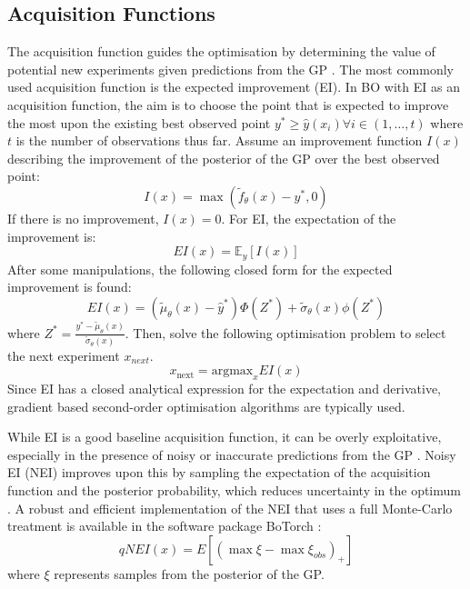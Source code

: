 \subsection{Acquisition Functions}

The acquisition function guides the optimisation by determining the value of potential new experiments given predictions from the GP \cite{Shahriari2016}. The most commonly used acquisition function is the expected improvement (EI). In BO with EI as an acquisition function, the aim is to choose the point that is expected to improve the most upon the existing best observed point $y^* \geq \hat y(x_i) \forall i \in (1, \dots, t)$  where  $t$ is the number of observations thus far. Assume an improvement function $I(x)$ describing the improvement of the posterior of the GP over the best observed point:
\begin{equation}
    I(x) = \max(\tilde f_{\theta}(x) -y^*, 0)
\end{equation}
If there is no improvement, $I(x)=0$. For EI, the expectation of the improvement is:
\begin{equation}
    EI(x) = \mathbb E_{y}[I(x)]
\end{equation}
After some manipulations, the following closed form for the expected improvement is found:
\begin{equation}
    EI(x) =(\tilde \mu_{\theta}(x)-\hat y^*)\Phi(Z^*) + \tilde \sigma_{\theta}(x) \phi(Z^*)
\end{equation}
where $Z^*= \frac{y^*-\tilde\mu_{\theta}(x)}{\tilde \sigma_{\theta}(x)}$.  Then, solve the following optimisation problem to select the next experiment $x_{next}$.
\begin{equation}
    x_{\text{next}} = \text{argmax}_{x} EI(x)
\end{equation}
Since EI has a closed analytical expression for the expectation and derivative, gradient based second-order optimisation algorithms are typically used. 

While EI is a good baseline acquisition function, it can be overly exploitative, especially in the presence of noisy or inaccurate predictions from the GP \cite{Letham2019}.  Noisy EI (NEI) improves upon this by sampling the expectation of the acquisition function and the posterior probability, which reduces uncertainty in the optimum \cite{Letham2019}. A robust and efficient implementation of the NEI that uses a full Monte-Carlo treatment is available in the software package BoTorch \cite{Balandat2020}:
\begin{equation}
qNEI(x)= E[(\max \xi  - \max \xi_{obs} )_+]
\end{equation}
where $\xi$ represents samples from the posterior of the GP.

